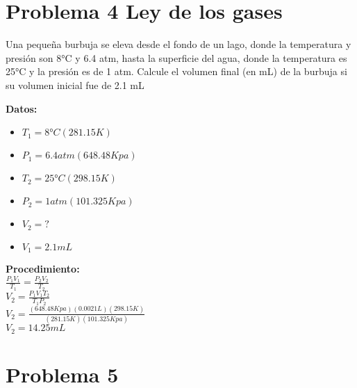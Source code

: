 \documentclass[12pt, letterpaper]{article}
\begin{document}
\section{Problema 4 Ley de los gases}
Una pequeña burbuja se eleva desde el fondo de un lago, donde la temperatura y presión son 8°C
y 6.4 atm, hasta la superficie del agua, donde la temperatura es 25°C y la presión es de 1 atm.
Calcule el volumen final (en mL) de la burbuja si su volumen inicial fue de 2.1 mL
\begin{multicols}{2}
\large \textbf{Datos:}
\begin{itemize}
    \item $T_1 = 8°C(281.15K)$
    \item $P_1 = 6.4 atm (648.48 Kpa)$
    \item $T_2 = 25°C (298.15K)$
    \item $P_2 = 1atm (101.325Kpa)$
    \item $V_2 = ?$
    \item $V_1 = 2.1 mL$ 
\end{itemize}
\columnbreak

\large \textbf{Procedimiento:}\\

\large {$\frac{P_1V_1}{T_1}=\frac{P_2V_2}{T_2}$}\\

\large {$V_2 =\frac{P_1V_1T_2}{T_1P_2}$}\\

\large {$V_2 =\frac{(648.48Kpa)(0.0021L)(298.15K)}{(281.15K)(101.325Kpa)}$}\\

\ul {\large $V_2 = 14.25 mL$}
\end{multicols}


\section{Problema 5}
\end{document}
